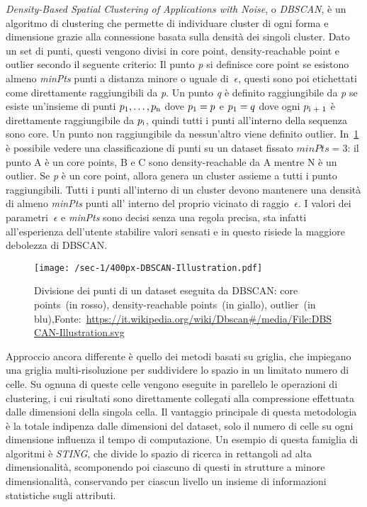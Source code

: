 \textit{Density-Based Spatial Clustering of Applications with Noise}, o \textit{DBSCAN}, è un algoritmo
di clustering che permette di individuare cluster di ogni forma e dimensione grazie alla connessione basata sulla densità dei singoli cluster.
Dato un set di punti, questi vengono divisi in core point, density-reachable point e outlier secondo il seguente criterio:
Il punto \textit{p} si definisce core point se esistono almeno \textit{minPts} punti a distanza minore o uguale di
\(~\epsilon \), questi sono poi etichettati come direttamente raggiungibili da \textit{p}.
Un punto \textit{q} è definito raggiungibile da \textit{p} se esiste un'insieme di punti
\(p\textsubscript{1},\ldots, p\textsubscript{n}\) dove \(p\textsubscript{1} = p \) e
\(p\textsubscript{1} = q \) dove ogni \(p\textsubscript{i + 1}\) è direttamente raggiungibile da
\(p\textsubscript{i}\), quindi tutti i punti all'interno della sequenza sono core.
Un punto non raggiungibile da nessun'altro viene definito outlier.
In~\cref*{fig:chap-1:dbscan-points} è possibile vedere una classificazione di punti su un dataset fissato
\(minPts=3\): il punto A è un core points, B e C sono density-reachable da A mentre N è un outlier.
Se \textit{p} è un core point, allora genera un cluster assieme a tutti i punto raggiungibili.
Tutti i punti all'interno di un cluster devono mantenere una densità di almeno \textit{minPts} punti all'
interno del proprio vicinato di raggio \(~\epsilon \).
I valori dei parametri \(~\epsilon \) e \textit{minPts} sono decisi senza una regola precisa, sta infatti all'esperienza dell'utente stabilire valori sensati e in questo risiede la maggiore debolezza di DBSCAN\@.

\begin{figure}
  \centering
  \texttt{[image: /sec-1/400px-DBSCAN-Illustration.pdf]}
  \caption{Divisione dei punti di un dataset eseguita da DBSCAN\@: core points~(in rosso), density-reachable points~(in giallo), outlier~(in blu),Fonte:~\url{https://it.wikipedia.org/wiki/Dbscan\#/media/File:DBSCAN-Illustration.svg}}%
  \label{fig:chap-1:dbscan-points}
\end{figure}

Approccio ancora differente è quello dei metodi basati su griglia, che impiegano una griglia multi-risoluzione
per suddividere lo spazio in un limitato numero di celle.
Su ognuna di queste celle vengono eseguite in parellelo le operazioni di clustering, i cui risultati sono direttamente collegati alla compressione
effettuata dalle dimensioni della singola cella.
Il vantaggio principale di questa metodologia è la totale indipenza dalle dimensioni del dataset, solo il numero di
celle su ogni dimensione influenza il tempo di computazione. Un esempio di questa famiglia di algoritmi è \textit{STING}\cite{wang1997sting},
che divide lo spazio di ricerca in rettangoli ad alta dimensionalità, scomponendo poi ciascuno di questi
in strutture a minore dimensionalità, conservando per ciascun livello un insieme di informazioni statistiche sugli attributi.

